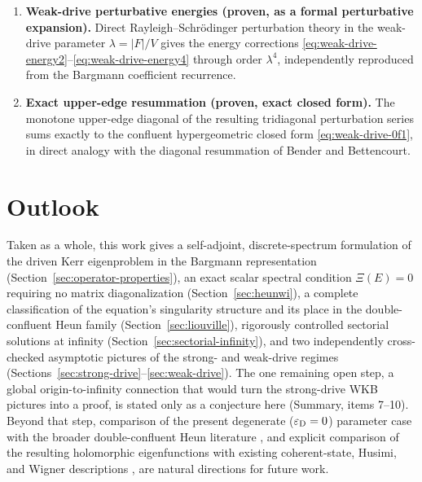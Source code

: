 \documentclass[11pt]{article}
\theoremstyle{remark}
\begin{document}
\begin{enumerate}
 in the Fedoryuk normal form identifies two candidate sectorial energy
 branches \eqref{eq:fedoryuk-local-energies}; under the (conjectured)
 Fedoryuk--Bargmann orientation hypothesis of
 Section~\ref{sec:sectorial-solutions} selecting the imaginary-axis branch,
 and under the further Global Fedoryuk--Bargmann connection hypotheses
 H1--H3 of Conjecture~\ref{conj:fedoryuk-bargmann-lemma}, the resulting
 conditional quantization condition \eqref{eq:fedoryuk-conditional-quantization}
 agrees with item~9's formal series; both the orientation choice and H1--H3
 are unproved, and this agreement is again only a consistency check.
\item \textbf{Weak-drive perturbative energies (proven, as a formal
 perturbative expansion).} Direct Rayleigh--Schr\"odinger perturbation
 theory in the weak-drive parameter $\lambda=|F|/V$ gives the energy
 corrections \eqref{eq:weak-drive-energy2}--\eqref{eq:weak-drive-energy4}
 through order $\lambda^4$, independently reproduced from the Bargmann
 coefficient recurrence.
\item \textbf{Exact upper-edge resummation (proven, exact closed form).}
 The monotone upper-edge diagonal of the resulting tridiagonal perturbation
 series sums exactly to the confluent hypergeometric closed form
 \eqref{eq:weak-drive-0f1}, in direct analogy with the diagonal resummation
 of Bender and Bettencourt.
\end{enumerate}

\section{Outlook}
\label{sec:outlook}

Taken as a whole, this work gives a self-adjoint, discrete-spectrum
formulation of the driven Kerr eigenproblem in the Bargmann representation
(Section~\ref{sec:operator-properties}), an exact scalar spectral condition
$\Xi(E)=0$ requiring no matrix diagonalization
(Section~\ref{sec:heunwi}), a complete classification of the equation's
singularity structure and its place in the double-confluent Heun family
(Section~\ref{sec:liouville}), rigorously controlled sectorial solutions at
infinity (Section~\ref{sec:sectorial-infinity}), and two independently
cross-checked asymptotic pictures of the strong- and weak-drive regimes
(Sections~\ref{sec:strong-drive}--\ref{sec:weak-drive}).  The one remaining
open step, a global origin-to-infinity connection that would turn the
strong-drive WKB pictures into a proof, is stated only as a conjecture here
(Summary, items 7--10).  Beyond that step, comparison of the present
degenerate ($\varepsilon_{\rm D}=0$) parameter case with the broader
double-confluent Heun literature
\cite{Buhring1994DCHE,ElJaickFigueiredo2008Solutions,
ElJaickFigueiredo2013Coulomb,IshkhanyanEtAl2014DCHE,Leaver1986Spectral}, and
explicit comparison of the resulting holomorphic eigenfunctions with
existing coherent-state, Husimi, and Wigner descriptions
\cite{MaslovaEtAl2019Squeezing,KirchmairEtAl2013Kerr}, are natural
directions for future work.
\end{document}
